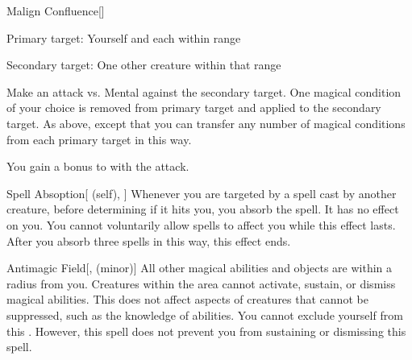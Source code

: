 \lowercase{\hypertarget{spell:Malign Confluence}{}}\label{spell:Malign Confluence}
\begin{freeability}[Rank 6]{\hypertarget{spell:Malign Confluence}{Malign Confluence}}[]

Primary target: Yourself and each  within \rngmed range
\par\noindent
Secondary target: One other creature within that range

Make an attack vs. Mental against the secondary target.
\hit One magical condition of your choice is removed from primary target and applied to the secondary target.
\crit As above, except that you can transfer any number of magical conditions from each primary target in this way.

 You gain a  bonus to  with the attack.
\end{freeability}
\vspace{0.25em}



\lowercase{\hypertarget{spell:Spell Absoption}{}}\label{spell:Spell Absoption}
\begin{attuneability}[Rank 7]{\hypertarget{spell:Spell Absoption}{Spell Absoption}}[ (self), ]
Whenever you are targeted by a spell cast by another creature, before determining if it hits you, you absorb the spell.
It has no effect on you.
You cannot voluntarily allow spells to affect you while this effect lasts.
After you absorb three spells in this way, this effect ends.
\end{attuneability}
\vspace{0.25em}



\lowercase{\hypertarget{spell:Antimagic Field}{}}\label{spell:Antimagic Field}
\begin{freeability}[Rank 8]{\hypertarget{spell:Antimagic Field}{Antimagic Field}}[,  (minor)]
All other magical abilities and objects are  within a \areamed radius  from you.
Creatures within the area cannot activate, sustain, or dismiss magical abilities.
This does not affect aspects of creatures that cannot be suppressed, such as the knowledge of abilities.
You cannot exclude yourself from this .
However, this spell does not prevent you from sustaining or dismissing this spell.
\end{freeability}
\vspace{0.25em}


